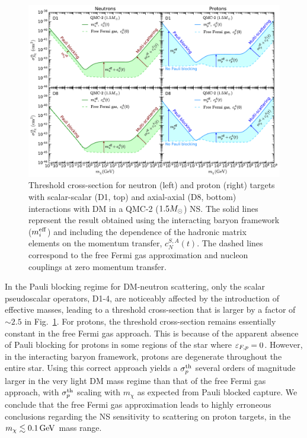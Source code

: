 \begin{figure}[t!bp]
   \centering
\includegraphics[width=\textwidth]{capture_3/sigmath_N_D1_D8.pdf}
\caption[Threshold cross-section for neutron (left) and proton (right) targets with scalar-scalar (D1, top) and axial-axial (D8, bottom) interactions with DM in a QMC-2 ($1.5\Msun$) NS. ]{Threshold cross-section for neutron (left) and proton (right) targets with scalar-scalar (D1, top) and axial-axial (D8, bottom) interactions with DM in a QMC-2 ($1.5\Msun$) NS. 
The solid lines represent the result obtained using the interacting baryon framework ($m_i^{\rm eff}$) and including the dependence of the hadronic matrix elements on the momentum transfer, $c_N^{S,A}(t)$. The dashed lines correspond to the free Fermi gas approximation and nucleon couplings at zero momentum transfer. }
   \label{ch5:fig:sigmathcomp}
\end{figure}


In the Pauli blocking regime for DM-neutron scattering, only the scalar pseudoscalar operators, D1-4,  are noticeably affected by the introduction of effective masses, leading to a threshold cross-section that is larger by a factor of $\sim2.5$ in Fig.~\ref{ch5:fig:sigmathcomp}. For protons, the threshold cross-section remains essentially constant in the free Fermi gas approach. This is because of the apparent absence of Pauli blocking for protons in some regions of the star where $\varepsilon_{F,p}=0$. However, in the interacting baryon framework, protons are degenerate throughout the entire star. Using this correct approach yields a $\sigma^\mathrm{th}_p$ several orders of magnitude larger in the very light DM mass regime than that of the free Fermi gas approach, with $\sigma^\mathrm{th}_p$ scaling with $m_\chi$ as expected from Pauli blocked capture. 
We conclude that the free Fermi gas approximation leads to highly erroneous conclusions regarding the NS sensitivity to scattering on proton targets, in the $m_\chi\lesssim0.1{\rm \,GeV}$ mass range. 


